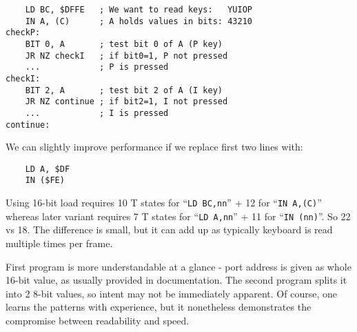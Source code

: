 \begin{lstlisting}
    LD BC, $DFFE   ; We want to read keys:   YUIOP
    IN A, (C)      ; A holds values in bits: 43210
checkP:
    BIT 0, A       ; test bit 0 of A (P key)
    JR NZ checkI   ; if bit0=1, P not pressed
    ...            ; P is pressed
checkI:
    BIT 2, A       ; test bit 2 of A (I key)
    JR NZ continue ; if bit2=1, I not pressed
    ...            ; I is pressed
continue:
\end{lstlisting}

We can slightly improve performance if we replace first two lines with:

\begin{lstlisting}
    LD A, $DF
    IN ($FE)
\end{lstlisting}

Using 16-bit load requires 10 T states for ``{\tt LD BC,nn}'' + 12 for ``{\tt IN A,(C)}'' whereas later variant requires 7 T states for ``{\tt LD A,nn}'' + 11 for ``{\tt IN (nn)}''. So 22 vs 18. The difference is small, but it can add up as typically keyboard is read multiple times per frame.

First program is more understandable at a glance - port address is given as whole 16-bit value, as usually provided in documentation. The second program splits it into 2 8-bit values, so intent may not be immediately apparent. Of course, one learns the patterns with experience, but it nonetheless demonstrates the compromise between readability and speed.



\pagebreak